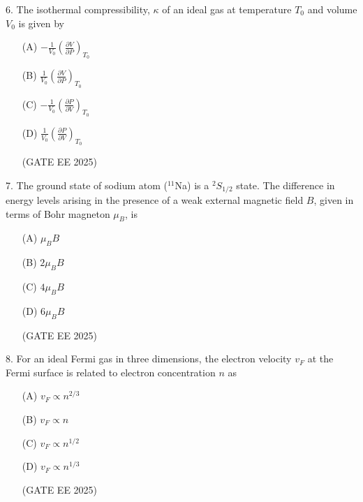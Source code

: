 \documentclass[twocolumn]{article}
\begin{document}
6. The isothermal compressibility, $\kappa$ of an ideal gas at temperature $T_0$ and volume $V_0$ is given by

\begin{itemize}
\item[(A)] $\displaystyle -\frac{1}{V_0} \left( \frac{\partial V}{\partial P} \right)_{T_0}$

\item[(B)] $\displaystyle \frac{1}{V_0} \left( \frac{\partial V}{\partial P} \right)_{T_0}$

\item[(C)] $\displaystyle -\frac{1}{V_0} \left( \frac{\partial P}{\partial V} \right)_{T_0}$

\item[(D)] $\displaystyle \frac{1}{V_0} \left( \frac{\partial P}{\partial V} \right)_{T_0}$

(GATE EE 2025)
  \end{itemize}




7. The ground state of sodium atom ($^{11}$Na) is a ${}^2S_{1/2}$ state.  
The difference in energy levels arising in the presence of a weak external magnetic field $B$, given in terms of Bohr magneton $\mu_B$, is

\begin{itemize}
\item[(A)] $\mu_B B$ \\
\item[(B)] $2 \mu_B B$ \\
\item[(C)] $4 \mu_B B$ \\
\item[(D)] $6 \mu_B B$

(GATE EE 2025)
  \end{itemize}




8. For an ideal Fermi gas in three dimensions, the electron velocity $v_F$ at the Fermi surface is related to electron concentration $n$ as

\begin{itemize}
\item[(A)] $v_F \propto n^{2/3}$

\item[(B)] $v_F \propto n$

\item[(C)] $v_F \propto n^{1/2}$

\item[(D)] $v_F \propto n^{1/3}$

(GATE EE 2025)
  \end{itemize}
\end{document}
